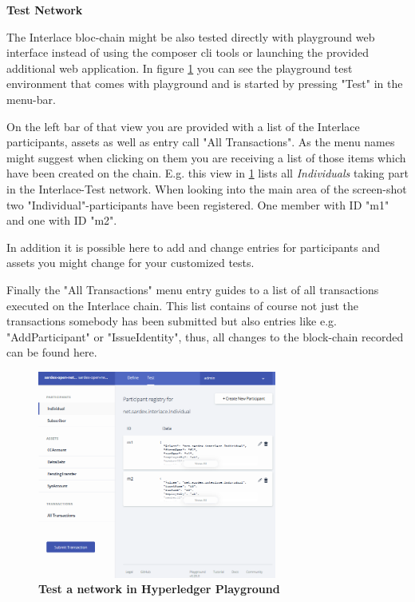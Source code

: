\textbf{Test Network}

The Interlace bloc-chain might be also tested directly with playground web interface instead of using the composer cli tools or launching the provided additional web application. In figure \ref{fig:test-network} you can see the playground test environment that comes with playground and is started by pressing "Test" in the menu-bar.

On the left bar of that view you are provided with a list of the Interlace participants, assets as well as entry call "All Transactions". As the menu names might suggest when clicking on them you are receiving a list of those items which have been created on the chain. E.g. this view in \ref{fig:test-network} lists all \textit{Individuals} taking part in the Interlace-Test network. When looking into the main area of the screen-shot two "Individual"-participants have been registered. One member with ID "m1" and one with ID "m2".

In addition it is possible here to add and change entries for participants and assets you might change for your customized tests.

Finally the "All Transactions" menu entry guides to a list of all transactions executed on the Interlace chain. This list contains of course not just the transactions somebody has been submitted but also entries like e.g. "AddParticipant" or "IssueIdentity", thus, all changes to the block-chain recorded can be found here.

\begin{figure}[htbp]
  \centering
  \includegraphics[width=0.7\textwidth]{Figures/test-network}
  \caption{\bf\small Test a network in Hyperledger Playground}
  \label{fig:test-network}
\end{figure}

